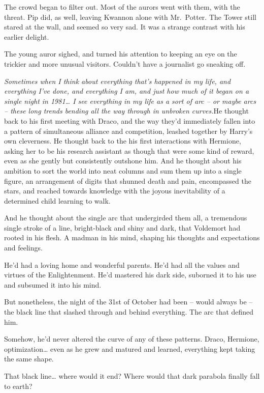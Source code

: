 The crowd began to filter out. Most of the aurors went with them, with
the threat. Pip did, as well, leaving Kwannon alone with Mr.~Potter. The
Tower still stared at the wall, and seemed so very sad. It was a strange
contrast with his earlier delight.

The young auror sighed, and turned his attention to keeping an eye on
the trickier and more unusual visitors. Couldn't have a journalist go
sneaking off.

\mybreak

\emph{Sometimes when I think about everything that's happened in my
life, and everything I've done, and everything I am, and just how much
of it began on a single night in 1981\ldots{} I see everything in my
life as a sort of arc -- or maybe arcs -- these long trends bending all
the way through in unbroken curves.}He thought back to his first meeting
with Draco, and the way they'd immediately fallen into a pattern of
simultaneous alliance and competition, leashed together by Harry's own
cleverness. He thought back to the his first interactions with Hermione,
asking her to be his research assistant as though that were some kind of
reward, even as she gently but consistently outshone him. And he thought
about his ambition to sort the world into neat columns and sum them up
into a single figure, an arrangement of digits that shunned death and
pain, encompassed the stars, and reached towards knowledge with the
joyous inevitability of a determined child learning to walk.

And he thought about the single arc that undergirded them all, a
tremendous single stroke of a line, bright-black and shiny and dark,
that Voldemort had rooted in his flesh. A madman in his mind, shaping
his thoughts and expectations and feelings.

He'd had a loving home and wonderful parents. He'd had all the values
and virtues of the Enlightenment. He'd mastered his dark side, suborned
it to his use and subsumed it into his mind.

But nonetheless, the night of the 31st of October had been -- would
always be -- the black line that slashed through and behind everything.
The arc that defined him.

Somehow, he'd never altered the curve of any of these patterns. Draco,
Hermione, optimization\ldots{} even as he grew and matured and learned,
everything kept taking the same shape.

That black line\ldots{} where would it end? Where would that dark
parabola finally fall to earth?

